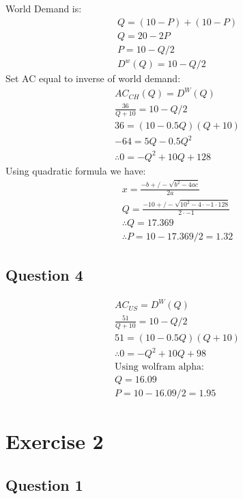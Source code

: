 \documentclass{article}
\begin{document}
World Demand is:
\begin{gather*}
  Q = (10 - P) + (10 - P) \\
  Q = 20 - 2P \\
  P = 10 - Q/2 \\
  D^{w}(Q) = 10 - Q/2
\end{gather*}
Set AC equal to inverse of world demand:
\begin{gather*}
  AC_{CH}(Q) = D^{W}(Q) \\
  \frac{36}{Q + 10} = 10 - Q/2 \\
  36 = (10 - 0.5Q)(Q + 10) \\
  -64 = 5Q - 0.5Q^{2} \\
  \therefore 0 = -Q^{2} + 10Q + 128
\end{gather*}
Using quadratic formula we have:
\begin{gather*}
  x = \frac{-b +/- \sqrt{b^{2} - 4ac}}{2a} \\
  Q = \frac{-10 +/- \sqrt{10^{2} - 4 \cdot -1 \cdot 128}}{2 \cdot -1} \\
  \therefore Q = 17.369 \\
  \therefore P = 10 - 17.369/2 = 1.32
\end{gather*}

\par \vspace{0.8em}
\subsection{Question 4}

\begin{gather*}
  AC_{US} = D^{W}(Q) \\
  \frac{51}{Q + 10} = 10 - Q/2 \\
  51 = (10 - 0.5Q)(Q + 10) \\
  \therefore 0 = -Q^{2} + 10Q + 98 \\
  \text{Using wolfram alpha:} \\
  Q = 16.09 \\
  P = 10 - 16.09/2 = 1.95
\end{gather*}

\section{Exercise 2}
\vspace{6mm}
\subsection{Question 1}
\end{document}
